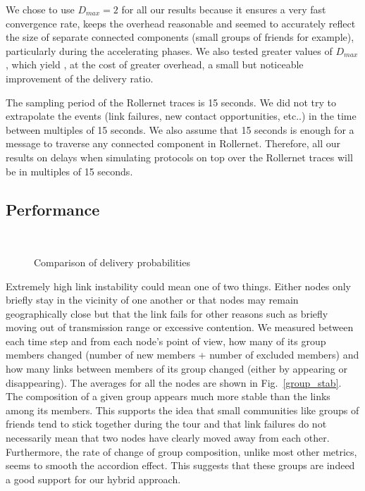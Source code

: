 \documentclass[10pt,twocolumn,letterpaper]{article}
\begin{document}
We chose to use $D_{max}=2$ for all our results because it ensures a
very fast convergence rate, keeps the overhead reasonable and seemed
to accurately reflect the size of separate connected components (small
groups of friends for example), particularly during the accelerating
phases. We also tested greater values of $D_{max}$, which yield , at
the cost of greater overhead, a small but noticeable improvement of
the delivery ratio.

The sampling period of the Rollernet traces is 15 seconds. We did not
try to extrapolate the events (link failures, new contact
opportunities, etc..) in the time between multiples of 15 seconds. We
also assume that 15 seconds is enough for a message to traverse any
connected component in Rollernet. Therefore, all our results on delays
when simulating protocols on top over the Rollernet traces will be in
multiples of 15 seconds.


\subsection{Performance}

\begin{figure}[t]
  \centering
   \\
  \caption{Comparison of delivery probabilities}
  \label{cfs}
\end{figure}

Extremely high link instability could mean one of two things. Either
nodes only briefly stay in the vicinity of one another or that nodes
may remain geographically close but that the link fails for other
reasons such as briefly moving out of transmission range or excessive
contention. We measured between each time step and from each node's
point of view, how many of its group members changed (number of new
members + number of excluded members) and how many links between
members of its group changed (either by appearing or
disappearing). The averages for all the nodes are shown in
Fig.~\ref{group_stab}. The composition of a given group appears much
more stable than the links among its members. This supports the idea
that small communities like groups of friends tend to stick together
during the tour and that link failures do not necessarily mean that
two nodes have clearly moved away from each other. Furthermore, the
rate of change of group composition, unlike most other metrics, seems
to smooth the accordion effect. This suggests that these groups are
indeed a good support for our hybrid approach.
\end{document}
